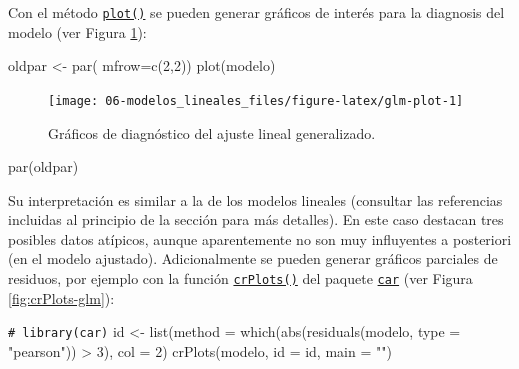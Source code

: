 \documentclass[
]{book}
\newenvironment{Shaded}{\begin{snugshade}}{\end{snugshade}}
\newcommand{\AttributeTok}[1]{\textcolor[rgb]{0.77,0.63,0.00}{#1}}
\newcommand{\CommentTok}[1]{\textcolor[rgb]{0.56,0.35,0.01}{\textit{#1}}}
\newcommand{\DecValTok}[1]{\textcolor[rgb]{0.00,0.00,0.81}{#1}}
\newcommand{\FunctionTok}[1]{\textcolor[rgb]{0.00,0.00,0.00}{#1}}
\newcommand{\NormalTok}[1]{#1}
\newcommand{\OtherTok}[1]{\textcolor[rgb]{0.56,0.35,0.01}{#1}}
\newcommand{\SpecialCharTok}[1]{\textcolor[rgb]{0.00,0.00,0.00}{#1}}
\newcommand{\StringTok}[1]{\textcolor[rgb]{0.31,0.60,0.02}{#1}}
\theoremstyle{break}
\theoremstyle{nonumberplain}
\renewcommand{\CommentTok}[1]{\textcolor[rgb]{0.41,0.41,0.41}{\texttt{#1}}}
\begin{document}
Con el método \href{https://rdrr.io/r/stats/plot.lm.html}{\texttt{plot()}} se pueden generar gráficos de interés para la diagnosis del modelo (ver Figura \ref{fig:glm-plot}):

\begin{Shaded}
\begin{Highlighting}[]
\NormalTok{oldpar }\OtherTok{\textless{}{-}} \FunctionTok{par}\NormalTok{( }\AttributeTok{mfrow=}\FunctionTok{c}\NormalTok{(}\DecValTok{2}\NormalTok{,}\DecValTok{2}\NormalTok{))}
\FunctionTok{plot}\NormalTok{(modelo)}
\end{Highlighting}
\end{Shaded}

\begin{figure}[!htb]

{\centering \texttt{[image: 06-modelos\_lineales\_files/figure-latex/glm-plot-1]} 

}

\caption{Gráficos de diagnóstico del ajuste lineal generalizado.}\label{fig:glm-plot}
\end{figure}

\begin{Shaded}
\begin{Highlighting}[]
\FunctionTok{par}\NormalTok{(oldpar)}
\end{Highlighting}
\end{Shaded}

Su interpretación es similar a la de los modelos lineales (consultar las referencias incluidas al principio de la sección para más detalles).
En este caso destacan tres posibles datos atípicos, aunque aparentemente no son muy influyentes a posteriori (en el modelo ajustado).
Adicionalmente se pueden generar gráficos parciales de residuos, por ejemplo con la función \href{https://rdrr.io/pkg/car/man/crPlots.html}{\texttt{crPlots()}} del paquete \href{https://CRAN.R-project.org/package=car}{\texttt{car}} (ver Figura \ref{fig:crPlots-glm}):

\begin{Shaded}
\begin{Highlighting}[]
\CommentTok{\# library(car)}
\NormalTok{id }\OtherTok{\textless{}{-}} \FunctionTok{list}\NormalTok{(}\AttributeTok{method =} \FunctionTok{which}\NormalTok{(}\FunctionTok{abs}\NormalTok{(}\FunctionTok{residuals}\NormalTok{(modelo, }\AttributeTok{type =} \StringTok{"pearson"}\NormalTok{)) }\SpecialCharTok{\textgreater{}} \DecValTok{3}\NormalTok{), }\AttributeTok{col =} \DecValTok{2}\NormalTok{)}
\FunctionTok{crPlots}\NormalTok{(modelo, }\AttributeTok{id =}\NormalTok{ id, }\AttributeTok{main =} \StringTok{""}\NormalTok{)}
\end{Highlighting}
\end{Shaded}
\end{document}
